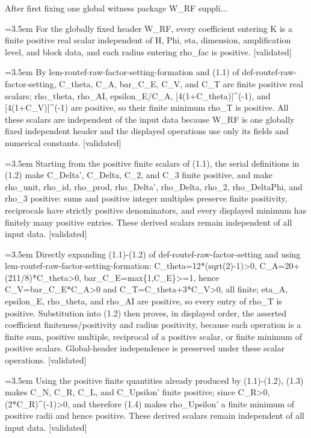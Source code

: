 \documentclass{article}
\newcommand{\step}[1]{\par\noindent\hangindent=3.5em\hangafter=1%
  \makebox[3.5em][l]{\textbf{#1.}}}
\newcommand{\steptag}[1]{\hfill{\small\textsf{[#1]}}}
\begin{document}
\begin{proofbox}{After first fixing one global witness package W\_RF suppli...}
\step{1.2} For the globally fixed header W\_RF, every coefficient entering K is a finite positive real scalar independent of H, Phi, eta, dimension, amplification level, and block data, and each radius entering rho\_fac is positive. \steptag{validated} \\[6pt]
\step{1.2.1} By lem-routef-raw-factor-setting-formation and (1.1) of def-routef-raw-factor-setting, C\_theta, C\_A, bar\_C\_E, C\_V, and C\_T are finite positive real scalars; rho\_theta, rho\_AI, epsilon\_E/C\_A, [4(1+C\_theta)]\textasciicircum{}(-1), and [4(1+C\_V)]\textasciicircum{}(-1) are positive, so their finite minimum rho\_T is positive. All these scalars are independent of the input data because W\_RF is one globally fixed independent header and the displayed operations use only its fields and numerical constants. \steptag{validated} \\[4pt]
\step{1.2.2} Starting from the positive finite scalars of (1.1), the serial definitions in (1.2) make C\_Delta', C\_Delta, C\_2, and C\_3 finite positive, and make rho\_unit, rho\_id, rho\_prod, rho\_Delta', rho\_Delta, rho\_2, rho\_DeltaPhi, and rho\_3 positive: sums and positive integer multiples preserve finite positivity, reciprocals have strictly positive denominators, and every displayed minimum has finitely many positive entries. These derived scalars remain independent of all input data. \steptag{validated} \\[6pt]
\step{1.2.2.1} Directly expanding (1.1)-(1.2) of def-routef-raw-factor-setting and using lem-routef-raw-factor-setting-formation: C\_theta=12*(sqrt(2)-1)>0, C\_A=20+(211/8)*C\_theta>0, bar\_C\_E=max\{1,C\_E\}>=1, hence C\_V=bar\_C\_E*C\_A>0 and C\_T=C\_theta+3*C\_V>0, all finite; eta\_A, epsilon\_E, rho\_theta, and rho\_AI are positive, so every entry of rho\_T is positive. Substitution into (1.2) then proves, in displayed order, the asserted coefficient finiteness/positivity and radius positivity, because each operation is a finite sum, positive multiple, reciprocal of a positive scalar, or finite minimum of positive scalars. Global-header independence is preserved under these scalar operations. \steptag{validated} \\[4pt]
\step{1.2.3} Using the positive finite quantities already produced by (1.1)-(1.2), (1.3) makes C\_N, C\_R, C\_L, and C\_Upsilon' finite positive; since C\_R>0, (2*C\_R)\textasciicircum{}(-1)>0, and therefore (1.4) makes rho\_Upsilon' a finite minimum of positive radii and hence positive. These derived scalars remain independent of all input data. \steptag{validated} \\[6pt]

\end{proofbox}
\end{document}
